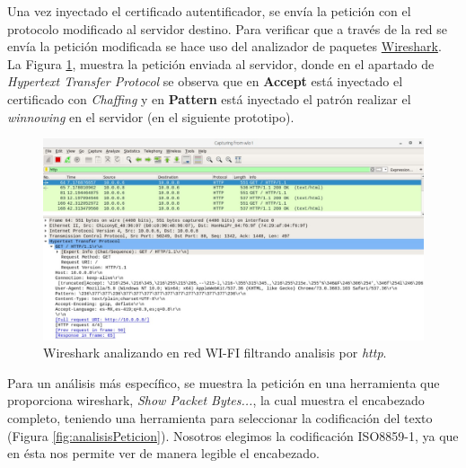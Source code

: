 \documentclass[12pt, a4paper, titlepage]{report}
\begin{document}
            Una vez inyectado el certificado autentificador, se envía la petición con el protocolo modificado al servidor destino. Para verificar que a través de la red se envía la petición modificada se hace uso del analizador de paquetes \hyperref[WiresharkDefinition]{Wireshark}.\\ La Figura \ref{fig:wiresharkAnalizando}, muestra la petición enviada al servidor, donde en el apartado de \textit{Hypertext Transfer Protocol} se observa que en \textbf{Accept} está inyectado el certificado con \textit{Chaffing} y en \textbf{Pattern} está inyectado el patrón realizar el \textit{winnowing} en el servidor (en el siguiente prototipo).
    
            \begin{figure}[H]
        		\begin{center}	\includegraphics[width=13cm]{./imagenes/Desarrollo/Componente_1/Version1/wiresharkFull.jpeg}
        			\caption{Wireshark analizando en red WI-FI filtrando analisis por \textit{http}.}
        			\label{fig:wiresharkAnalizando}
        		\end{center}
        	\end{figure}
	
        	Para un análisis más específico, se muestra la petición en una herramienta que proporciona wireshark, \textit{Show Packet Bytes...}, la cual muestra el encabezado completo, teniendo una herramienta para seleccionar la codificación del texto (Figura \ref{fig:analisisPeticion}). Nosotros elegimos la codificación ISO8859-1, ya que en ésta nos permite ver de manera legible el encabezado.
	
\end{document}
